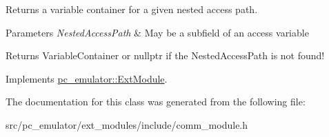 Returns a variable container for a given nested access path. 


\begin{DoxyParams}{Parameters}
{\em Nested\+Access\+Path} & May be a subfield of an access variable \\
\hline
\end{DoxyParams}
\begin{DoxyReturn}{Returns}
Variable\+Container or nullptr if the Nested\+Access\+Path is not found! 
\end{DoxyReturn}


Implements \hyperlink{classpc__emulator_1_1ExtModule_a5a967d2cf1925ae2f2811892e034db14}{pc\+\_\+emulator\+::\+Ext\+Module}.



The documentation for this class was generated from the following file\+:\begin{DoxyCompactItemize}
\item 
src/pc\+\_\+emulator/ext\+\_\+modules/include/comm\+\_\+module.\+h\end{DoxyCompactItemize}
